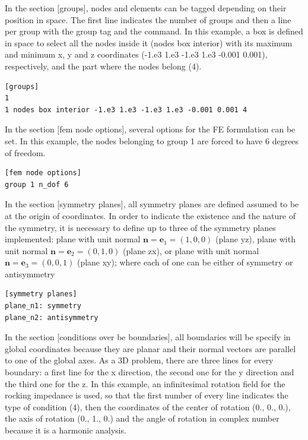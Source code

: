 \documentclass[a4]{article}
\begin{document}
In the section [groups], nodes and elements can be tagged depending on their position in space. The first line indicates the number of groups and then a line per group with the group tag and the command. In this example, a box is defined in space to select all the nodes inside it (nodes box interior) with its maximum and minimum x, y and z coordinates (-1.e3 1.e3 -1.e3 1.e3 -0.001 0.001), respectively, and the part where the nodes belong (4).    

\begin{Verbatim}
[groups]
1
1 nodes box interior -1.e3 1.e3 -1.e3 1.e3 -0.001 0.001 4 
\end{Verbatim}

In the section [fem node options], several options for the FE formulation can be set. In this example, the nodes belonging to group 1 are forced to have 6 degrees of freedom.  

\begin{Verbatim}
[fem node options]
group 1 n_dof 6
\end{Verbatim}

In the section [symmetry planes], all symmetry planes are defined assumed to be at the origin of coordinates. In order to indicate the existence and the nature of the symmetry, it is necessary to define up to three of the symmetry planes implemented: plane with unit normal $ \textbf{n} = \textbf{e}_1 = (1, 0, 0) $ (plane yz), plane with unit normal $ \textbf{n} = \textbf{e}_2 = (0, 1, 0) $ (plane zx), or plane with unit normal $ \textbf{n} = \textbf{e}_3 = (0, 0, 1) $ (plane xy); where each of one can be either of symmetry or antisymmetry

\begin{Verbatim}
[symmetry planes]
plane_n1: symmetry
plane_n2: antisymmetry
\end{Verbatim}

In the section [conditions over be boundaries], all boundaries will be specify in global coordinates because they are planar and their normal vectors are parallel to one of the global axes. As a 3D problem, there are three lines for every boundary: a first line for the x direction, the second one for the y direction and the third one for the z. In this example, an infinitesimal rotation field for the rocking impedance is used, so that the first number of every line indicates the type of condition (4), then the coordinates of the center of rotation (0., 0., 0.), the axis of rotation (0., 1., 0.) and the angle of rotation in complex number because it is a harmonic analysis.
\end{document}
